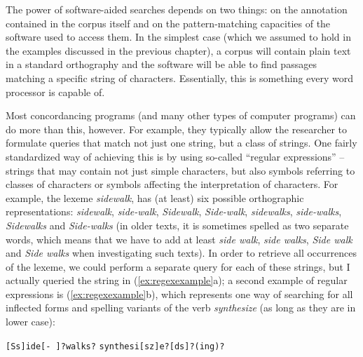 The power of software-aided searches depends on two things: on the annotation contained in the corpus itself and on the pattern-matching capacities of the software used to access them. In the simplest case (which we assumed to hold in the examples discussed in the previous chapter), a corpus will contain plain text in a standard orthography and the software will be able to find passages matching a specific string of characters. Essentially, this is something every word processor is capable of. 

Most concordancing programs (and many other types of computer programs) can do more than this, however. For example, they typically allow the researcher to formulate queries that match not just one string, but a class of strings. One fairly standardized way of achieving this is by using so-called ``regular expressions'' -- strings that may contain not just simple characters, but also symbols referring to classes of characters or symbols affecting the interpretation of characters. For example, the lexeme \textit{sidewalk}, has (at least) six possible orthographic representations: \textit{sidewalk}, \textit{side-walk}, \textit{Sidewalk}, \textit{Side-walk}, \textit{sidewalks}, \textit{side-walks}, \textit{Sidewalks} and \textit{Side-walks} (in older texts, it is sometimes spelled as two separate words, which means that we have to add at least \textit{side walk}, \textit{side walks}, \textit{Side walk} and \textit{Side walks} when investigating such texts). In order to retrieve all occurrences of the lexeme, we could perform a separate query for each of these strings, but I actually queried the string in (\ref{ex:regexexample}a); a second example of regular expressions is (\ref{ex:regexexample}b), which represents one way of searching for all inflected forms and spelling variants of the verb \textit{synthesize} (as long as they are in lower case):

\begin{exe}
\ex
\begin{xlist} 
\label{ex:regexexample}
\ex \texttt{[Ss]ide[- ]?walks?}
\ex \texttt{synthesi[sz]e?[ds]?(ing)?}
\end{xlist}
\end{exe}

